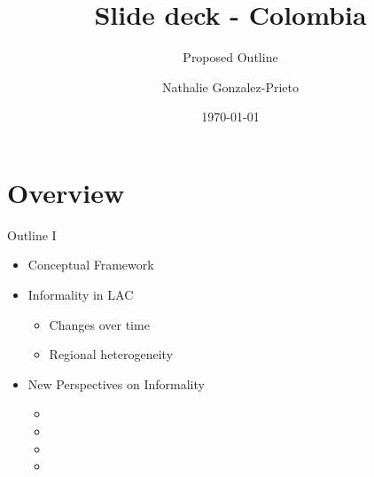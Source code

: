 \documentclass[10pt,xcolor=dvipsnames]{beamer}
\title{Slide deck - Colombia}
\subtitle{Proposed Outline}
\date{\today}
\author{Nathalie Gonzalez-Prieto}
\institute{}
\begin{document}
\maketitle



\section[Overview]{Overview}

\begin{frame}[fragile]{Outline I}
    \begin{itemize}
    
\item Conceptual Framework
\item Informality in LAC
      \begin{itemize}
        \item Changes over time
        \item Regional heterogeneity
     \end{itemize}
\item New Perspectives on Informality
    \begin{itemize}
    \item 
        \item 
        \item 
        \item 
     \end{itemize}
\end{itemize}            
\end{frame}
\end{document}
